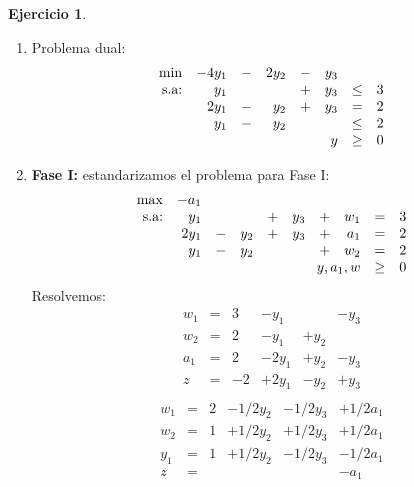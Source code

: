 \documentclass[a4paper,oneside,12pt]{amsart}
\theoremstyle{definition}
\newtheorem{quest}{Ejercicio}
\begin{document}
    \begin{quest}
        \item \begin{enumerate}[label=\alph*)]
                  \item  Problema dual:
                  \[
                        \begin{array}{rrcrcrcr}
                            \min & -4y_1 & - & 2y_2 & - & y_3 & & \\
                            \text{s.a:} & y_1 &  &  & + & y_3 & \leq & 3\\
                            & 2y_1 & - & y_2 & + & y_3 & = & 2\\
                            & y_1 & - & y_2 &  & & \leq & 2\\
                            & \multicolumn{5}{r}{y} & \geq & 0 \\
                        \end{array}
                        \]
                  \item \textbf{Fase I:} estandarizamos el problema para Fase I:
                  \[
                        \begin{array}{rrcrcrcrcr}
                            \max & -a_1 & & & & & & \\
                            \text{s.a:} & y_1 &  &  & + & y_3 & + & w_1 & = & 3\\
                            & 2y_1 & - & y_2 & + & y_3 & + & a_1 & = & 2\\
                            & y_1 & - & y_2 &  & & + & w_2 & = & 2\\
                            & \multicolumn{7}{r}{y,a_1,w} & \geq & 0 \\
                        \end{array}
                        \]
                  Resolvemos:
                          \[
                            \begin{array}{rcllll}
                            w_1 & =  &3 &-y_1 &  &-y_3\\
                            w_2 & =  &2 &-y_1 &+y_2 & \\
                            a_1 & =  &2 &-2y_1 &+y_2 &-y_3\\\hline
                            z &= &-2 &+2y_1 &-y_2 &+y_3\\
                            \end{array}
                            \]
                            \vspace{1cm}
                            \[
                            \begin{array}{rcllll}
                            w_1 & =  &2 &-1/2y_2 &-1/2y_3 &+1/2a_1\\
                            w_2 & =  &1 &+1/2y_2 &+1/2y_3 &+1/2a_1\\
                            y_1 & =  &1 &+1/2y_2 &-1/2y_3 &-1/2a_1\\\hline
                            z &= &  &  &  &-a_1\\
                            \end{array}
                            \]


\end{enumerate}
\end{quest}
\end{document}
